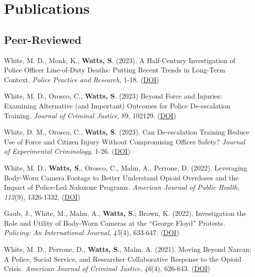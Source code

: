 \documentclass[11pt,]{article}
\begin{document}
\hypertarget{publications}{%
\section{Publications}\label{publications}}

\hypertarget{peer-reviewed}{%
\subsection{Peer-Reviewed}\label{peer-reviewed}}

White, M. D., Monk, K., \textbf{Watts, S}. (2023). A Half-Century
Investigation of Police Officer Line-of-Duty Deaths: Putting Recent
Trends in Long-Term Context. \emph{Police Practice and Research}, 1-18.
(\href{https://www-tandfonline-com.ezproxy1.lib.asu.edu/doi/abs/10.1080/15614263.2023.2267728}{DOI})

White, M. D., Orosco, C., \textbf{Watts, S}. (2023) Beyond Force and
Injuries: Examining Alternative (and Important) Outcomes for Police
De-escalation Training. \emph{Journal of Criminal Justice}, 89, 102129.
(\href{https://www-sciencedirect-com.ezproxy1.lib.asu.edu/science/article/pii/S0047235223001009?casa_token=OxErc72pD-QAAAAA:XATyRNg9im-Y4tSAmatE2RofJft49bpMx7c4_fOCiLyqIILE_rMDU03IA2yVHSmdepnLIrpzNfw}{DOI})

White, D. M., Orosco, C., \textbf{Watts, S}. (2023). Can De-escalation
Training Reduce Use of Force and Citizen Injury Without Compromising
Officer Safety? \emph{Journal of Experimental Criminology}, 1-26.
(\href{https://link-springer-com.ezproxy1.lib.asu.edu/article/10.1007/s11292-023-09584-8}{DOI})

White, M. D., \textbf{Watts, S}., Orosco, C., Malm, A., Perrone, D.
(2022). Leveraging Body-Worn Camera Footage to Better Understand Opioid
Overdoses and the Impact of Police-Led Naloxone Programs. \emph{American
Journal of Public Health}, \emph{112}(9), 1326-1332.
(\href{https://ajph.aphapublications.org/doi/abs/10.2105/AJPH.2022.306918}{DOI})

Gaub, J., White, M., Malm, A., \textbf{Watts, S}., Brown, K. (2022).
Investigation the Role and Utility of Body-Worn Cameras at the ``George
Floyd'' Protests. \emph{Policing: An International Journal},
\emph{45}(4), 633-647.
(\href{https://www.emerald.com/insight/content/doi/10.1108/PIJPSM-10-2021-0151/full/html}{DOI})

White, M. D., Perrone, D., \textbf{Watts, S}., Malm, A. (2021). Moving
Beyond Narcan: A Police, Social Service, and Researcher Collaborative
Response to the Opioid Crisis. \emph{American Journal of Criminal
Justice}, \emph{46}(4), 626-643.
(\href{https://link-springer-com.ezproxy1.lib.asu.edu/article/10.1007/s12103-021-09625-w}{DOI})
\end{document}
